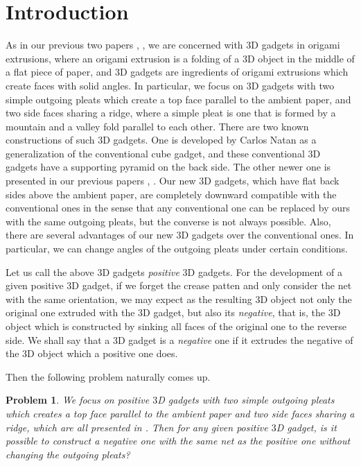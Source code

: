 \documentclass[11pt]{amsart}
\newtheorem{problem}[theorem]{Problem}
\numberwithin{equation}{section}
\numberwithin{theorem}{section}
\begin{document}
\section{Introduction}\label{sec:introduction}
As in our previous two papers \cite{Doi19}, \cite{Doi20}, we are concerned with $3$D gadgets in origami extrusions,
where an origami extrusion is a folding of a $3$D object in the middle of a flat piece of paper, 
and $3$D gadgets are ingredients of origami extrusions which create faces with solid angles.
In particular, we focus on $3$D gadgets with two simple outgoing pleats which create a top face parallel to the ambient paper, and two side faces sharing a ridge,
where a simple pleat is one that is formed by a mountain and a valley fold parallel to each other.
There are two known constructions of such $3$D gadgets.
One is developed by Carlos Natan \cite{Natan} as a generalization of the conventional cube gadget,
and these conventional $3$D gadgets have a supporting pyramid on the back side.
The other newer one is presented in our previous papers \cite{Doi19}, \cite{Doi20}.
Our new $3$D gadgets, which have flat back sides above the ambient paper, are completely downward compatible with the conventional ones in the sense
that any conventional one can be replaced by ours with the same outgoing pleats, but the converse is not always possible.
Also, there are several advantages of our new $3$D gadgets over the conventional ones.
In particular, we can change angles of the outgoing pleats under certain conditions.

Let us call the above $3$D gadgets \emph{positive} $3$D gadgets.
For the development of a given positive $3$D gadget, if we forget the crease patten and only consider the net with the same orientation,
we may expect as the resulting $3$D object not only the original one extruded with the $3$D gadget, but also its \emph{negative}, that is,
the $3$D object which is constructed by sinking all faces of the original one to the reverse side.
We shall say that a $3$D gadget is a \emph{negative} one if it extrudes the negative of the $3$D object which a positive one does.

Then the following problem naturally comes up.
\begin{problem}\rm\label{prob:existence_negative}
We focus on positive $3$D gadgets with two simple outgoing pleats which creates a top face parallel to the ambient paper and two side faces sharing a ridge,
which are all presented in \cite{Doi20}.
Then for any given positive $3$D gadget, is it possible to construct a negative one with the same net as the positive one without changing the outgoing pleats?
\end{problem}
\end{document}
